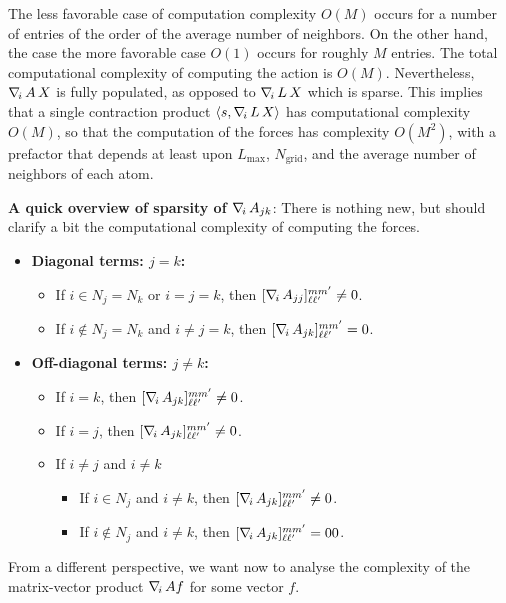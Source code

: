 The less favorable case of computation complexity $O(M)$ occurs for a number of entries of the order of the average number of neighbors. On the other hand, the case the more favorable case $O(1)$ occurs for roughly $M$ entries. The total computational complexity of computing the action is $O(M)$. Nevertheless, $\nabla_{\!i}\, A \, X$ is fully populated, as opposed to $\nabla_{\!i}\, L \, X$ which is sparse. This implies that a single contraction product $\langle s , \nabla_{\!i}\, L \, X \rangle$ has computational complexity $O(M)$, so that the computation of the forces has complexity $O(M^2)$, with a prefactor that depends at least upon $L_\text{max}$, $N_\text{grid}$, and the average number of neighbors of each atom.

\noindent
{\bf A quick overview of sparsity of $\nabla_{\!i}\, A_{jk}$}: There is nothing new, but should clarify a bit the computational complexity of computing the forces.
\begin{itemize}
\item {\bf Diagonal terms: $j=k$:}
	\begin{itemize}
		\item If $i\in N_j=N_k$ or $i=j=k$, then $[ \nabla_{\!i}\, A_{jj}]_{\ell \ell'}^{m m'} \neq 0$. 
		\item If $i\not \in N_j=N_k$ and  $i\neq j=k$, then $[ \nabla_{\!i}\, A_{jk}]_{\ell \ell'}^{m m'} = 0$.
	\end{itemize}
\item {\bf Off-diagonal terms: $j\neq k$:}
	\begin{itemize}
		\item If $i=k$, then $[ \nabla_{\!i}\, A_{jk}]_{\ell \ell'}^{m m'} \neq 0$.
		\item If $i=j$, then $[ \nabla_{\!i}\, A_{jk}]_{\ell \ell'}^{m m'} \neq 0$.
		\item If $i\neq j$ and $i\neq k$
		\begin{itemize}
			\item If $i\in N_j$ and $i\neq k$, then $[ \nabla_{\!i}\, A_{jk}]_{\ell \ell'}^{m m'} \neq 0$.
			\item If $i\not\in N_j$ and $i\neq k$, then $[ \nabla_{\!i}\, A_{jk}]_{\ell \ell'}^{m m'} =0 0$.
		\end{itemize}
	\end{itemize}
\end{itemize}
From a different perspective, we want now to analyse the complexity of the matrix-vector product $\nabla_{\!i}\, A f$ for some vector $f$.
%

